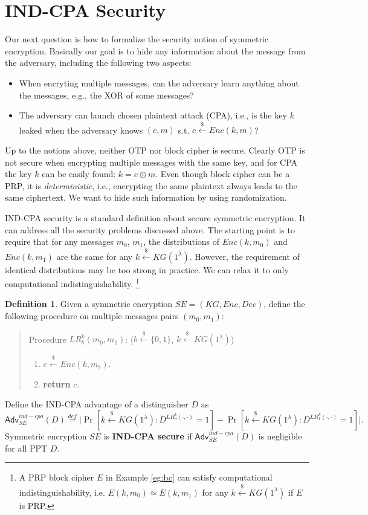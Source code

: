 \documentclass[12pt]{article}
\newcommand{\eqdef}{\stackrel{def}{=}}
\newcommand{\bits}{\{0,1\}}
\newcommand{\getsr}{\stackrel{\$}{\gets}}
\newcommand{\Adv}{\mathsf{Adv}}
\theoremstyle{definition}
\newtheorem{definition}[theorem]{Definition}
\begin{document}
\section{IND-CPA Security}
Our next question is how to formalize the security notion of symmetric encryption. Basically our goal is to hide any information about the message from the adversary, including the following two aspects:
\begin{itemize}
\item When encryting multiple messages, can the adversary learn anything about the messages, e.g., the XOR of some messages?
\item The adversary can launch chosen plaintext attack (CPA), i.e., is the key $k$ leaked when the adversary knows $(c, m)$ s.t. $c \getsr Enc(k, m)$?
\end{itemize}
Up to the notions above, neither OTP nor block cipher is secure. 
Clearly OTP is not secure when encrypting multiple messages with the same key, and for CPA the key $k$ can be easily found: $k = c \oplus m$. 
Even though block cipher can be a PRP, it is \emph{deterministic}, i.e., encrypting the same plaintext always leads to the same ciphertext. We want to hide such information by using randomization.

IND-CPA security is a standard definition about secure symmetric encryption. It can address all the security problems discussed above.
The starting point is to require that for any messages $m_0$, $m_1$, the distributions of $Enc(k, m_0)$ and $Enc(k, m_1)$ are the same for any $k \getsr KG(1^\lambda)$. However, the requirement of identical distributions may be too strong in practice. We can relax it to only computational indistinguishability. \footnote{A PRP block cipher $E$ in Example \ref{eg:bc} can satisfy computational indistinguishability, i.e. $E(k, m_0) \simeq E(k, m_1)$ for any $k \getsr KG(1^\lambda)$ if $E$ is PRP.}

\begin{definition}
\label{def:ic}
Given a symmetric encryption $SE = (KG, Enc, Dec)$, define the following procedure on multiple messages pairs $(m_0, m_1)$:
\begin{quote}
Procedure $LR_b^k(m_0, m_1)$: ($b \getsr \bits$, $k \getsr KG(1^\lambda)$)
\begin{enumerate}
\item $c \getsr Enc(k, m_b)$.
\item {\bf return} $c$.
\end{enumerate}
\end{quote}

Define the IND-CPA advantage of a distinguisher $D$ as
$$\Adv_{SE}^{ind-cpa}(D) \eqdef \bigg| \Pr[k \getsr KG(1^\lambda) : D^{LR_0^k(\cdot, \cdot)}=1] - \Pr[k \getsr KG(1^\lambda) : D^{LR_1^k(\cdot, \cdot)}=1] \bigg|.$$
Symmetric encryption $SE$ is {\bf IND-CPA secure} if $\Adv_{SE}^{ind-cpa}(D)$ is negligible for all PPT $D$.
\end{definition}
\end{document}
